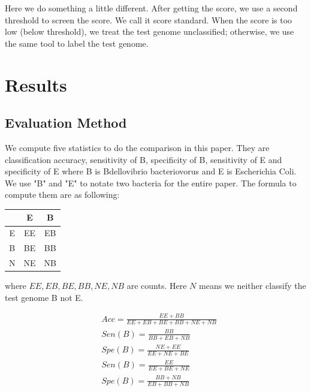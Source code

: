 \documentclass[12pt]{article} %
\begin{document}
Here we do something a little different. After getting the score, we use a second threshold to screen the score. We call it score standard. When the score is too low (below threshold), we treat the test genome unclassified; otherwise, we use the same tool to label the test genome. 

\section{Results}
\subsection{Evaluation Method}
We compute five statistics to do the comparison in this paper. They are classification accuracy, sensitivity of B, specificity of B, sensitivity of E and specificity of E where B is Bdellovibrio bacteriovorus and E is Escherichia Coli. We use "B" and "E" to notate two bacteria for the entire paper. The formula to compute them are as following:

\begin{table}
\centering
\begin{tabular}{|c|c|c|}
\hline
 & E & B \\
 \hline
 E & EE & EB \\
 \hline
 B & BE & BB \\
 \hline
 N & NE & NB \\
 \hline
\end{tabular}
\end{table}
where $EE, EB, BE, BB, NE, NB$ are counts. Here $N$ means we neither classify the test genome B not E. 

\begin{equation}
\begin{aligned}
&Acc = \frac{EE+BB}{EE+EB+BE+BB+NE+NB}\\
&Sen(B) = \frac{BB}{BB+EB+NB}\\
&Spe(B) = \frac{NE+EE}{EE+NE+BE}\\
&Sen(B) = \frac{EE}{EE+BE+NE}\\
&Spe(B) = \frac{BB+NB}{EB+BB+NB}
\end{aligned}
\end{equation}
\end{document}
